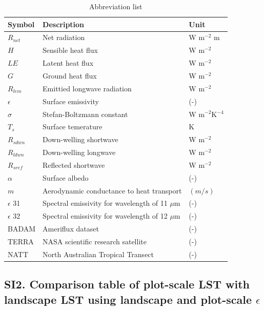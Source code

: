 \documentclass[fleqn,10pt]{wlscirep}
\begin{document}
{\begin{table}[h!]
\centering
\caption{Abbreviation list}
\begin{tabular}{p{2.5cm} p{3.0cm} p{3.0cm}}

\hline

Symbol & Description & Unit\\

\hline
$R_{net}$ & Net radiation & W m$^{-2}$ m \\
$H$ & Sensible heat flux & W m$^{-2}$ \\
$LE$ & Latent heat flux & W m$^{-2}$ \\
$G$ & Ground heat flux & W m$^{-2}$ \\
$R_{lem}$ & Emittied longwave radiation & W m$^{-2}$ \\
$\epsilon$ & Surface emissivity & (-)\\
$\sigma$ & Stefan-Boltzmann constant & W m$^{-2}$K$^{-4}$\\
$T_{s}$ & Surface temerature & K\\
$R_{sdwn}$ & Down-welling shortwave & W m$^{-2}$\\
$R_{ldwn}$ & Down-welling longwave & W m$^{-2}$\\
$R_{sref}$ & Reflected shortwave & W m$^{-2}$\\
$\alpha$ & Surface albedo & (-)\\
$m$ & Aerodynamic conductance to heat transport & $(m/s)$\\
$\epsilon$ 31 & Spectral emissivity for wavelength of 11 $\mu$m & (-) \\
$\epsilon$ 32 & Spectral emissivity for wavelength of 12 $\mu$m & (-)  \\
BADAM & Ameriflux dataset & (-) \\
TERRA & NASA scientific research satellite & (-)  \\
NATT & North Australian Tropical Transect & (-) \\

\hline
\end{tabular}
\label{table:SI2}
\end{table}

\subsection*{SI2. Comparison table of plot-scale LST with landscape LST using landscape and plot-scale $\epsilon$}

}
\end{document}
